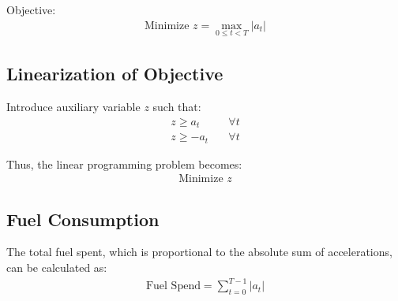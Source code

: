 \documentclass{article}
\begin{document}
Objective:
\begin{align}
    \text{Minimize } z = \max_{0 \le t < T} |a_t|
\end{align}

\subsection*{Linearization of Objective}

Introduce auxiliary variable \( z \) such that:
\begin{align}
    z \geq a_t &\quad \forall t \\
    z \geq -a_t &\quad \forall t
\end{align}

Thus, the linear programming problem becomes:
\begin{align}
    \text{Minimize } z
\end{align}

\subsection*{Fuel Consumption}

The total fuel spent, which is proportional to the absolute sum of accelerations, can be calculated as:
\begin{align}
    \text{Fuel Spend} = \sum_{t=0}^{T-1} |a_t|
\end{align}
\end{document}
